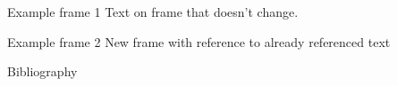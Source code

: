 \documentclass[aspectratio=169]{beamer}
\begin{document}
\begin{frame}{Example frame 1}
Text on frame that doesn't change.\\



\end{frame}

\begin{frame}{Example frame 2}
New frame with reference to already referenced text \cite{foo2}
\end{frame}

\begin{frame}{Bibliography}
\printbibliography
\end{frame}
\end{document}
